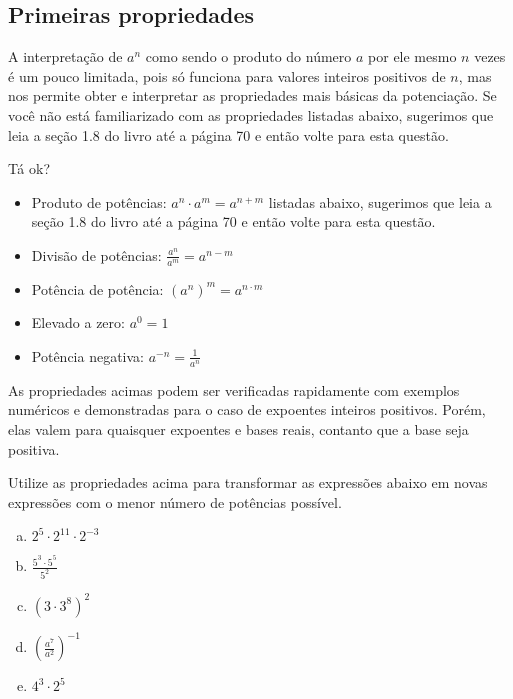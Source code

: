 \documentclass[main_estudante.tex]{subfiles}
\begin{document}
\subsection*{Primeiras propriedades}

A interpretação de $a^n$ como sendo o produto do número $a$ por ele mesmo $n$ vezes é um pouco limitada, pois só funciona para valores inteiros positivos de $n$, mas nos permite obter e interpretar as propriedades mais básicas da potenciação. Se você não está familiarizado com as propriedades listadas abaixo, sugerimos que leia a seção 1.8 do livro  até a página 70 e então volte para esta questão.

\begin{caixaExemplo}
Tá ok?
\begin{itemize}
 \item Produto de potências: $a^n \cdot a^m = a^{n+m}$ listadas abaixo, sugerimos que leia a seção 1.8 do livro  até a página 70 e então volte para esta questão.
 \item Divisão de potências: $\frac{a^n}{a^m} = a^{n-m}$
 \item Potência de potência: $(a^n)^m = a^{n \cdot m}$
 \item Elevado a zero: $a^0 = 1$
 \item Potência negativa: $a^{-n} = \frac{1}{a^n}$
\end{itemize}
\end{caixaExemplo}

As propriedades acimas podem ser verificadas rapidamente com exemplos numéricos e demonstradas para o caso de expoentes inteiros positivos. Porém, elas valem para quaisquer expoentes e bases reais, contanto que a base seja positiva.

\begin{questao}
Utilize as propriedades acima para transformar as expressões abaixo em novas expressões com o menor número de potências possível.
\begin{enumerate}[a)]
\item $2^5 \cdot 2^{11} \cdot 2^{-3}$
\item $\frac{5^3 \cdot 5^5}{5^2}$
\item $(3 \cdot 3^8)^2$
\item $(\frac{a^7}{a^2})^{-1}$
\item $4^3 \cdot 2^5$
\end{enumerate}
\end{questao}
\end{document}

